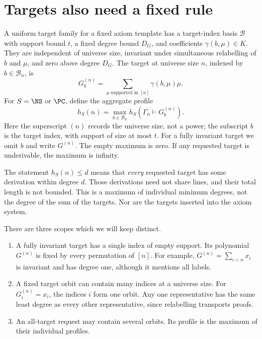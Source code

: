 \section{Targets also need a fixed rule}\label{tx:sec:target-request}
\begin{definition}\label{tx:def:target}
A uniform target family for a fixed axiom template has a target-index
basis $\mathcal B$ with support bound $t$, a fixed degree bound $D_G$,
and coefficients $\gamma(b,\mu)\in K$. They are independent of universe size,
invariant under simultaneous relabelling of $b$ and $\mu$, and zero
above degree $D_G$. The target at universe size $n$, indexed by $b\in\mathcal B_n$, is
\[
                  G_b^{(n)}=\sum_{\mu\text{ supported in }[n]}
                                     \gamma(b,\mu)\mu.
\]
For $S=\NS$ or $\PC$, define the aggregate profile
\begin{equation}\label{tx:eq:target-profile}
 h_S(n)=\max_{b\in\mathcal B_n}h_S(\Gamma_n\vdash G_b^{(n)}).
\end{equation}
Here the superscript $(n)$ records the universe size, not a power;
the subscript $b$ is the target index, with support of size at most $t$.
For a fully invariant target we omit $b$ and write $G^{(n)}$.
The empty maximum is zero. If any requested target is underivable,
the maximum is infinity.
\end{definition}

The statement $h_S(n)\le d$ means that \emph{every} requested target
has some derivation within degree $d$. Those derivations need not share
lines, and their total length is not bounded. This is a maximum of
individual minimum degrees, not the degree of the sum of the targets.
Nor are the targets inserted into the axiom system.

There are three scopes which we will keep distinct.
\begin{enumerate}
\item A fully invariant target has a single index of empty support.
Its polynomial $G^{(n)}$ is fixed by every permutation of $[n]$. For
example, $G^{(n)}=\sum_{i<n}x_i$ is invariant and has degree one, although
it mentions all labels.
\item A fixed target orbit can contain many indices at a universe size. For
$G_i^{(n)}=x_i$, the indices $i$ form one orbit. Any one representative
has the same least degree as every other representative, since
relabelling transports proofs.
\item An all-target request may contain several orbits. Its profile
is the maximum of their individual profiles.
\end{enumerate}

